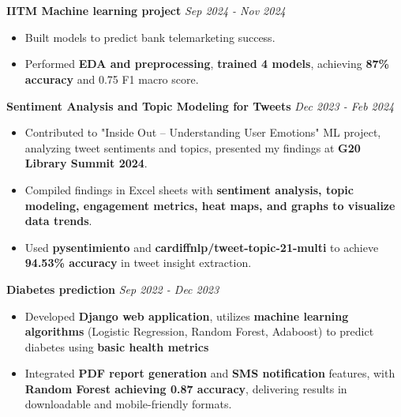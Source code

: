 \documentclass[a4paper,10pt]{article}
\begin{document}
\section{\scshape\color{Fuchsia}{\faLaptopCode\ \textbf PROJECTS}}
\textbf{IITM Machine learning project} \href{https://github.com/ShreehariA/IITM_MLP_Project}{} \hfill \textit{Sep 2024 - Nov 2024}
\vspace{-2mm}
\begin{itemize}
    \item Built models to predict bank telemarketing success.
    \vspace{-2mm}
    \item Performed \textbf{EDA and preprocessing}, \textbf{trained 4 models}, achieving \textbf{87\% accuracy} and 0.75 F1 macro score.
\end{itemize}
\textbf{Sentiment Analysis and Topic Modeling for Tweets} \href{https://github.com/ShreehariA/G20_Library_Summit}{} \hfill \textit{Dec 2023 - Feb 2024}
\vspace{-2mm}
\begin{itemize}
    \item Contributed to "Inside Out – Understanding User Emotions" ML project, analyzing tweet sentiments and topics, presented my findings at \textbf{G20 Library Summit 2024}.
    \vspace{-2mm}
    \item Compiled findings in Excel sheets with \textbf{sentiment analysis, topic modeling, engagement metrics, heat maps, and graphs to visualize data trends}.
    \vspace{-2mm}
    \item Used \textbf{pysentimiento} and \textbf{cardiffnlp/tweet-topic-21-multi} to achieve \textbf{94.53\% accuracy} in tweet insight extraction.
\end{itemize}
\textbf{Diabetes prediction} \href{https://github.com/ShreehariA/diabetes-pred}{} \hfill \textit{Sep 2022 - Dec 2023}
\vspace{-2mm}
\begin{itemize}
    \item Developed \textbf{Django web application}, utilizes \textbf{machine learning algorithms} (Logistic Regression, Random Forest, Adaboost) to predict diabetes using \textbf{basic health metrics}
    \vspace{-2mm}
    \item Integrated \textbf{PDF report generation} and \textbf{SMS notification} features, with \textbf{Random Forest achieving 0.87 accuracy}, delivering results in downloadable and mobile-friendly formats.
\end{itemize}
\end{document}
